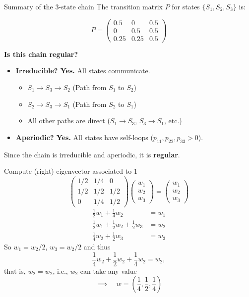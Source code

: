 \documentclass[aspectratio=169]{beamer}\usepackage[]{graphicx}\usepackage[]{xcolor}
\begin{document}
\begin{frame}{Summary of the 3-state chain}
    The transition matrix $P$ for states $\{S_1, S_2, S_3\}$ is:
    
    $$
    P = 
    \begin{pmatrix}
    0.5 & 0 & 0.5 \\
    0 & 0.5 & 0.5 \\
    0.25 & 0.25 & 0.5
    \end{pmatrix}
    $$
    
    \vfill
    
    \textbf{Is this chain regular?}
    \begin{itemize}
        \item \textbf{Irreducible? Yes.} All states communicate.
            \begin{itemize}
                \item $S_1 \to S_3 \to S_2$ (Path from $S_1$ to $S_2$)
                \item $S_2 \to S_3 \to S_1$ (Path from $S_2$ to $S_1$)
                \item All other paths are direct ($S_1 \to S_3$, $S_3 \to S_1$, etc.)
            \end{itemize}
        \item \textbf{Aperiodic? Yes.} All states have self-loops ($p_{11}, p_{22}, p_{33} > 0$).
    \end{itemize}
    \vfill
    Since the chain is irreducible and aperiodic, it is \textbf{regular}.
\end{frame}



\begin{frame}
Compute (right) eigenvector associated to 1
\[
\begin{pmatrix}
	1/2 & 1/4 & 0 \\
	1/2 & 1/2 & 1/2 \\
	0 & 1/4 & 1/2
\end{pmatrix}
\begin{pmatrix}
	w_1\\w_2\\w_3
\end{pmatrix}
=
\begin{pmatrix}
	w_1\\w_2\\w_3
\end{pmatrix}
\]
\begin{align*}
\frac 12 w_1+\frac 14 w_2 &= w_1 \\
\frac 12 w_1+\frac 12 w_2+\frac 12 w_3 &= w_2 \\
\frac 14 w_2+\frac 12 w_3 &= w_3
\end{align*}
So $w_1=w_2/2$, $w_3=w_2/2$ and thus
\[
\frac 14 w_2+\frac 12 w_2 +\frac 14 w_2=w_2,
\]
that is, $w_2=w_2$, i.e., $w_2$ can take any value
\vfill
\[
\implies\quad w=\left(\dfrac 14,\dfrac 12,\dfrac 14\right)
\]
\end{frame}
\end{document}
